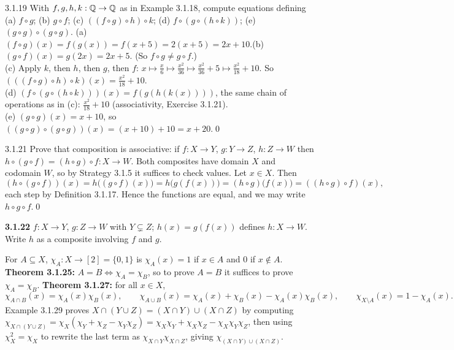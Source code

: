 \begin{bookex}[recommended]{3.1.19}
With $f,g,h,k:\mathbb{Q}\to\mathbb{Q}$ as in Example 3.1.18, compute equations defining (a) $f\circ g$; (b) $g\circ f$; (c) $((f\circ g)\circ h)\circ k$; (d) $f\circ(g\circ(h\circ k))$; (e) $(g\circ g)\circ(g\circ g)$.
\solution
(a) $(f\circ g)(x)=f(g(x))=f(x+5)=2(x+5)=2x+10$.\quad (b) $(g\circ f)(x)=g(2x)=2x+5$. (So $f\circ g\ne g\circ f$.)\\
(c) Apply $k$, then $h$, then $g$, then $f$: $x\mapsto\frac x6\mapsto\frac{x^2}{36}\mapsto\frac{x^2}{36}+5\mapsto\frac{x^2}{18}+10$. So $(((f\circ g)\circ h)\circ k)(x)=\frac{x^2}{18}+10$.\\
(d) $(f\circ(g\circ(h\circ k)))(x)=f(g(h(k(x))))$, the same chain of operations as in (c): $\frac{x^2}{18}+10$ (associativity, Exercise 3.1.21).\\
(e) $(g\circ g)(x)=x+10$, so $((g\circ g)\circ(g\circ g))(x)=(x+10)+10=x+20$.\qed
\end{bookex}

\begin{bookex}[bonus]{3.1.21}
Prove that composition is associative: if $f:X\to Y$, $g:Y\to Z$, $h:Z\to W$ then $h\circ(g\circ f)=(h\circ g)\circ f:X\to W$.
\solution
Both composites have domain $X$ and codomain $W$, so by Strategy 3.1.5 it suffices to check values. Let $x\in X$. Then
\[
(h\circ(g\circ f))(x)=h\big((g\circ f)(x)\big)=h\big(g(f(x))\big)=(h\circ g)\big(f(x)\big)=((h\circ g)\circ f)(x),
\]
each step by Definition 3.1.17. Hence the functions are equal, and we may write $h\circ g\circ f$.\qed
\end{bookex}

\begin{trybox}[{3.1.22 \fO}]
\textbf{3.1.22} $f:X\to Y$, $g:Z\to W$ with $Y\subsetneq Z$; $h(x)=g(f(x))$ defines $h:X\to W$. Write $h$ as a composite involving $f$ and $g$. 
\end{trybox}

\begin{key}
For $A\subseteq X$, $\chi_A:X\to[2]=\{0,1\}$ is $\chi_A(x)=1$ if $x\in A$ and $0$ if $x\notin A$. \textbf{Theorem 3.1.25:} $A=B\Leftrightarrow\chi_A=\chi_B$, so to prove $A=B$ it suffices to prove $\chi_A=\chi_B$. \textbf{Theorem 3.1.27:} for all $x\in X$,
\[
\chi_{A\cap B}(x)=\chi_A(x)\chi_B(x),\qquad \chi_{A\cup B}(x)=\chi_A(x)+\chi_B(x)-\chi_A(x)\chi_B(x),\qquad \chi_{X\setminus A}(x)=1-\chi_A(x).
\]
Example 3.1.29 proves $X\cap(Y\cup Z)=(X\cap Y)\cup(X\cap Z)$ by computing $\chi_{X\cap(Y\cup Z)}=\chi_X(\chi_Y+\chi_Z-\chi_Y\chi_Z)=\chi_X\chi_Y+\chi_X\chi_Z-\chi_X\chi_Y\chi_Z$, then using $\chi_X^2=\chi_X$ to rewrite the last term as $\chi_{X\cap Y}\chi_{X\cap Z}$, giving $\chi_{(X\cap Y)\cup(X\cap Z)}$.
\end{key}

